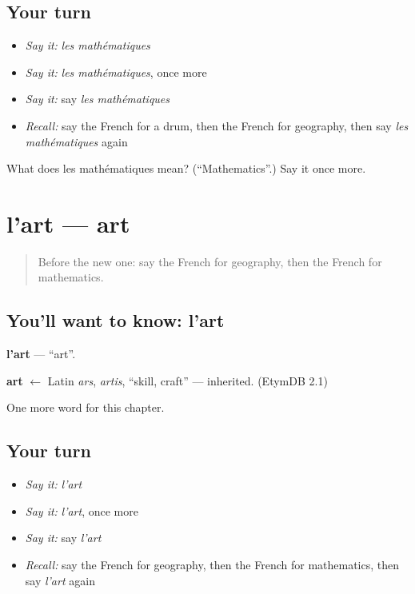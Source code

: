 \subsection*{Your turn}
\begin{itemize}
\raggedright
  \item \emph{Say it:} \emph{les mathématiques}
  \item \emph{Say it:} \emph{les mathématiques}, once more
  \item \emph{Say it:} say \emph{les mathématiques}
  \item \emph{Recall:} say the French for a drum, then the French for geography, then say \emph{les mathématiques} again
\end{itemize}

\begin{tcolorbox}[breakable,colback=teal!4,colframe=teal!35!black,title={Before you move on}]
What does les mathématiques mean? (\textquotedblleft{}Mathematics\textquotedblright{}.) Say it once more.
\end{tcolorbox}
\section[l'art]{l'art — art}

\label{lesson:FR-C257-art}



\begin{quote}
Before the new one: say the French for geography, then the French for mathematics.
\end{quote}

\subsection*{You'll want to know: l'art}
\textbf{l'art} — \textquotedblleft{}art\textquotedblright{}.

\begin{cousinweb}
\textbf{art} $\leftarrow$ Latin \emph{ars}, \emph{artis}, \textquotedblleft{}skill, craft\textquotedblright{} — inherited. (EtymDB 2.1)
\end{cousinweb}

\begin{grammarlens}[title={What you've built}]
One more word for this chapter.
\end{grammarlens}

\subsection*{Your turn}
\begin{itemize}
\raggedright
  \item \emph{Say it:} \emph{l'art}
  \item \emph{Say it:} \emph{l'art}, once more
  \item \emph{Say it:} say \emph{l'art}
  \item \emph{Recall:} say the French for geography, then the French for mathematics, then say \emph{l'art} again
\end{itemize}

